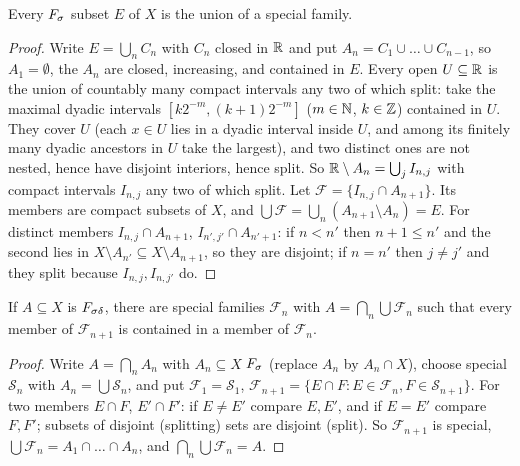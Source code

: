 \begin{lemma}\label{lem:special-from-fsigma}
Every $F_\sigma$ subset $E$ of $X$ is the union of a special family.
\end{lemma}
\begin{proof}
Write $E=\bigcup_nC_n$ with $C_n$ closed in $\mathbb{R}$ and put $A_n=C_1\cup\dots\cup C_{n-1}$, so $A_1=\emptyset$, the $A_n$
are closed, increasing, and contained in $E$. Every open $U\subseteq\mathbb{R}$ is the union of countably many compact intervals
any two of which split: take the maximal dyadic intervals $[k2^{-m},(k+1)2^{-m}]$ ($m\in\mathbb{N}$, $k\in\mathbb{Z}$) contained in $U$.
They cover $U$ (each $x\in U$ lies in a dyadic interval inside $U$, and among its finitely many dyadic ancestors in
$U$ take the largest), and two distinct ones are not nested, hence have disjoint interiors, hence split. So
$\mathbb{R}\setminus A_n=\bigcup_jI_{n,j}$ with compact intervals $I_{n,j}$ any two of which split. Let
$\mathcal F=\{I_{n,j}\cap A_{n+1}\}$. Its members are compact subsets of $X$, and
$\bigcup\mathcal F=\bigcup_n(A_{n+1}\setminus A_n)=E$. For distinct members $I_{n,j}\cap A_{n+1}$,
$I_{n',j'}\cap A_{n'+1}$: if $n<n'$ then $n+1\le n'$ and the second lies in $X\setminus A_{n'}\subseteq X\setminus
A_{n+1}$, so they are disjoint; if $n=n'$ then $j\ne j'$ and they split because $I_{n,j},I_{n,j'}$ do.
\end{proof}

\begin{lemma}\label{lem:special-sequence}
If $A\subseteq X$ is $F_{\sigma\delta}$, there are special families $\mathcal F_n$ with $A=\bigcap_n\bigcup\mathcal F_n$ such that
every member of $\mathcal F_{n+1}$ is contained in a member of $\mathcal F_n$.
\end{lemma}
\begin{proof}
Write $A=\bigcap_nA_n$ with $A_n\subseteq X$ $F_\sigma$ (replace $A_n$ by $A_n\cap X$), choose special $\mathcal S_n$ with
$A_n=\bigcup\mathcal S_n$, and put $\mathcal F_1=\mathcal S_1$, $\mathcal F_{n+1}=\{E\cap F:E\in\mathcal F_n,F\in\mathcal S_{n+1}\}$. For two members
$E\cap F$, $E'\cap F'$: if $E\ne E'$ compare $E,E'$, and if $E=E'$ compare $F,F'$; subsets of disjoint (splitting) sets are
disjoint (split). So $\mathcal F_{n+1}$ is special, $\bigcup\mathcal F_n=A_1\cap\dots\cap A_n$, and $\bigcap_n\bigcup\mathcal F_n=A$.
\end{proof}

